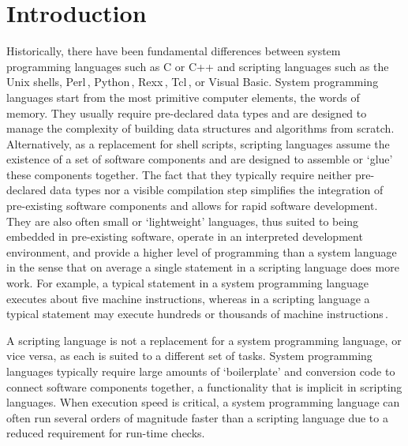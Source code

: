 \documentclass[10pt]{article}
\begin{document}
\section*{Introduction}
Historically, there have been fundamental differences between system 
programming languages such as C or C++ and
scripting languages such as the Unix shells,
Perl\,\cite{wall99:perl-progr-refer-guide},
Python\,\cite{martelli06:python-nutsh},
Rexx\,\cite{o'hara88:moder-progr-using-rexx},
Tcl\,\cite{ousterhout94:tcl-tk-toolk}, or Visual Basic.  System programming languages start from the most primitive computer elements, the words of memory. They usually
require pre-declared data types and are designed to manage the complexity of
building data structures and algorithms from scratch.  Alternatively, as a replacement for shell scripts, scripting languages assume the existence of a set of software components and are designed to assemble or `glue' these components together. The fact that
they typically require neither pre-declared data types nor a
visible compilation step simplifies the integration of pre-existing software components and allows for rapid software development.  They are also often small or `lightweight' languages, thus suited to being embedded in pre-existing software, operate in an interpreted development environment, and provide a higher level of programming than a system language in the sense that on average a single statement in a scripting language does more
work. For example, a typical statement in a system programming
language executes about five machine instructions, whereas in a
scripting language a typical statement may execute hundreds or thousands of machine instructions\,\cite{ousterhout98:scrip}.


A scripting language is not a replacement for a system programming language, or vice versa, as each is suited to a different set of tasks. System programming languages typically require large amounts of `boilerplate' and conversion code to connect software components together, a functionality that is implicit in scripting languages. When execution speed is critical, a system programming language can often run several orders of magnitude faster than a scripting language due to a reduced requirement for run-time checks.
\end{document}
